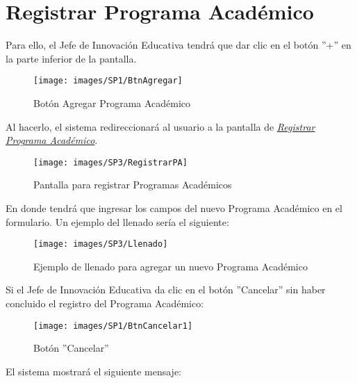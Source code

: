         \section{Registrar Programa Académico}

            Para ello, el Jefe de Innovación Educativa tendrá que dar clic en el botón ''+'' en la parte inferior de la pantalla.

            \begin{figure}[!hbtp]
                \centering
                \hypertarget{add}{\texttt{[image: images/SP1/BtnAgregar]}}
                \caption{Botón Agregar Programa Académico}
                \label{add}
            \end{figure}

            Al hacerlo, el sistema redireccionará al usuario a la pantalla de \hyperlink{registrarpa}{\textit{Registrar Programa Académico}}.

        \begin{figure}[!hbtp]
            \centering
            \hypertarget{registrarpa}{\texttt{[image: images/SP3/RegistrarPA]}}
            \caption{Pantalla para registrar Programas Académicos}
            \label{registrarpa}
        \end{figure}

        En donde tendrá que ingresar los campos del nuevo Programa Académico en el formulario. Un ejemplo del llenado sería el siguiente:

        \begin{figure}[!hbtp]
            \centering
            \hypertarget{ejreg}{\texttt{[image: images/SP3/Llenado]}}
            \caption{Ejemplo de llenado para agregar un nuevo Programa Académico}
            \label{ejreg}
        \end{figure}

        Si el Jefe de Innovación Educativa da clic en el botón ''Cancelar'' sin haber concluido el registro del Programa Académico:

        \begin{figure}[!hbtp]
            \centering
            \hypertarget{cancel1}{\texttt{[image: images/SP1/BtnCancelar1]}}
            \caption{Botón ''Cancelar''}
            \label{cancel1}
        \end{figure}

        El sistema mostrará el siguiente mensaje:

